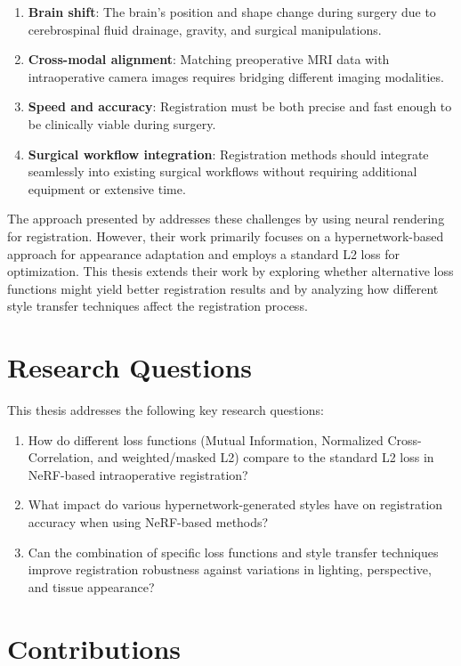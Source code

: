 \begin{enumerate}
    \item \textbf{Brain shift}: The brain's position and shape change during surgery due to cerebrospinal fluid drainage, gravity, and surgical manipulations.
    \item \textbf{Cross-modal alignment}: Matching preoperative MRI data with intraoperative camera images requires bridging different imaging modalities.
    \item \textbf{Speed and accuracy}: Registration must be both precise and fast enough to be clinically viable during surgery.
    \item \textbf{Surgical workflow integration}: Registration methods should integrate seamlessly into existing surgical workflows without requiring additional equipment or extensive time.
\end{enumerate}

The approach presented by \textcite{fehrentz2024intraoperative} addresses these challenges by using neural rendering for registration. However, their work primarily focuses on a hypernetwork-based approach for appearance adaptation and employs a standard L2 loss for optimization. This thesis extends their work by exploring whether alternative loss functions might yield better registration results and by analyzing how different style transfer techniques affect the registration process.

\section{Research Questions}

This thesis addresses the following key research questions:

\begin{enumerate}
    \item How do different loss functions (Mutual Information, Normalized Cross-Correlation, and weighted/masked L2) compare to the standard L2 loss in NeRF-based intraoperative registration?
    \item What impact do various hypernetwork-generated styles have on registration accuracy when using NeRF-based methods?
    \item Can the combination of specific loss functions and style transfer techniques improve registration robustness against variations in lighting, perspective, and tissue appearance?
\end{enumerate}

\section{Contributions}

